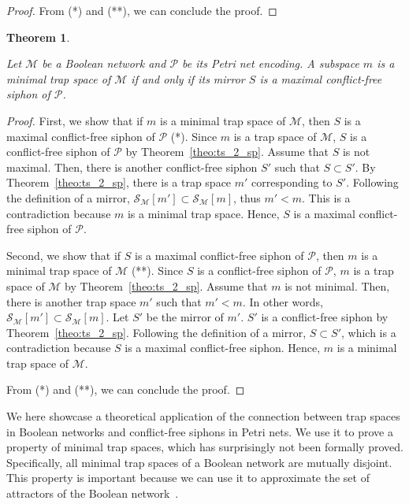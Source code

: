 \documentclass[preprint,12pt]{elsarticle}
\newtheorem{theorem}{Theorem}[section]
\begin{document}
\begin{proof}
  From (*) and (**), we can conclude the proof.
\end{proof}

\begin{theorem}%
\label{theo:min_ts_2_max_sp}

  Let \(\mathcal{M}\) be a Boolean network and \(\mathcal{P}\) be its Petri net encoding. A subspace \(m\) is a minimal trap space of \(\mathcal{M}\) if and only if its mirror \(S\) is a maximal conflict-free siphon of \(\mathcal{P}\).

\end{theorem}

\begin{proof}

  First, we show that if \(m\) is a minimal trap space of \(\mathcal{M}\), then \(S\) is a maximal conflict-free siphon of \(\mathcal{P}\) (*). Since \(m\) is a trap space of \(\mathcal{M}\), \(S\) is a conflict-free siphon of \(\mathcal{P}\) by Theorem~\ref{theo:ts_2_sp}. Assume that \(S\) is not maximal. Then, there is another conflict-free siphon \(S'\) such that \(S \subset S'\). By Theorem~\ref{theo:ts_2_sp}, there is a trap space \(m'\) corresponding to \(S'\). Following the definition of a mirror, \(\mathcal{S}_{\mathcal{M}}[m'] \subset \mathcal{S}_{\mathcal{M}}[m]\), thus \(m' < m\). This is a contradiction because \(m\) is a minimal trap space. Hence, \(S\) is a maximal conflict-free siphon of \(\mathcal{P}\).

  Second, we show that if \(S\) is a maximal conflict-free siphon of \(\mathcal{P}\), then \(m\) is a minimal trap space of \(\mathcal{M}\) (**). Since \(S\) is a conflict-free siphon of \(\mathcal{P}\), \(m\) is a trap space of \(\mathcal{M}\) by Theorem~\ref{theo:ts_2_sp}. Assume that \(m\) is not minimal. Then, there is another trap space \(m'\) such that \(m' < m\). In other words, \(\mathcal{S}_{\mathcal{M}}[m'] \subset \mathcal{S}_{\mathcal{M}}[m]\). Let \(S'\) be the mirror of \(m'\). \(S'\) is a conflict-free siphon by Theorem~\ref{theo:ts_2_sp}. Following the definition of a mirror, \(S \subset S'\), which is a contradiction because \(S\) is a maximal conflict-free siphon. Hence, \(m\) is a minimal trap space of \(\mathcal{M}\).

  From (*) and (**), we can conclude the proof.
\end{proof}

We here showcase a theoretical application of the connection between trap spaces in Boolean networks and conflict-free siphons in Petri nets.
We use it to prove a property of minimal trap spaces, which has surprisingly not been formally proved.
Specifically, all minimal trap spaces of a Boolean network are mutually disjoint.
This property is important because we can use it to approximate the set of attractors of the Boolean network~\cite{klarner2015computing}.
\end{document}
